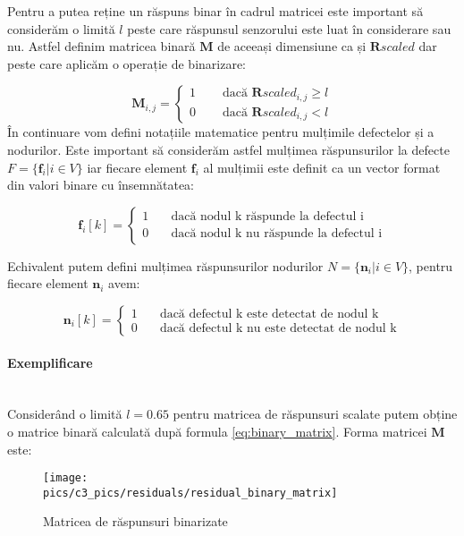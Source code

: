 Pentru a putea reține un răspuns binar în cadrul matricei este important să considerăm o limită $l$ peste care răspunsul senzorului este luat în considerare sau nu. Astfel definim matricea binară $\mathbf{M}$ de aceeași dimensiune ca și $\mathbf{R}scaled$ dar peste care aplicăm o operație de binarizare:

\begin{equation}
    \mathbf{M}_{i,j} = \begin{cases}
            1 &\quad \text{ dacă } \mathbf{R}scaled_{i,j} \geq l \\
            0 &\quad \text{ dacă } \mathbf{R}scaled_{i,j}  < l
    \end{cases}
\label{eq:binary_matrix}
\end{equation}
În continuare vom defini notațiile matematice pentru mulțimile defectelor și a nodurilor.
Este important să considerăm astfel mulțimea răspunsurilor la defecte $F = \{\mathbf{f}_i | i \in V \}$ iar fiecare element $\mathbf{f}_i$ al mulțimii este definit ca un vector format din valori binare cu însemnătatea:

\begin{equation}
\mathbf{f}_i[k] = \begin{cases}
       1 &\quad\text{dacă nodul k răspunde la defectul i}\\
       0 &\quad\text{dacă nodul k nu răspunde la defectul i}
     \end{cases}
\label{eq:fault_signature}
\end{equation}

Echivalent putem defini mulțimea răspunsurilor nodurilor $N =\{\mathbf{n}_i| i \in V\}$, pentru fiecare element $\mathbf{n}_i$ avem:

\begin{equation}
\mathbf{n}_i[k] = \begin{cases}
       1 &\quad\text{dacă defectul k este detectat de nodul k}\\
       0 &\quad\text{dacă defectul k nu este detectat de nodul k}
     \end{cases}
\label{eq:fault_signature}
\end{equation}

\paragraph{Exemplificare} \mbox{} \\

Considerând o limită $l=0.65$ pentru matricea de răspunsuri scalate putem obține o matrice binară calculată după formula \eqref{eq:binary_matrix}. Forma matricei $\mathbf{M}$ este:
\begin{figure}[H]
\centering
\texttt{[image: \\pics/c3\_pics/residuals/residual\_binary\_matrix]}
\caption{Matricea de răspunsuri binarizate}
\label{fig:binary_matrix}
\end{figure}



